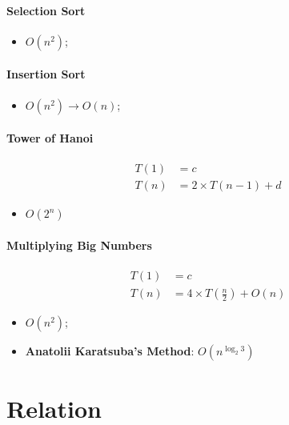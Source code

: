 \documentclass[letterpaper, 11pt]{article}
\begin{document}
      \paragraph{Selection Sort}
      \begin{itemize}
        \item $ O \left( n^{2} \right) $;
      \end{itemize}
      
      \paragraph{Insertion Sort}
      \begin{itemize}
        \item $ O \left( n^{2} \right) \to O \left( n \right) $;
      \end{itemize}
      
      \paragraph{Tower of Hanoi}
      \begin{align*}
        T \left( 1 \right) &= c \\ 
        T \left( n \right) &= 2 \times T \left( n - 1 \right) + d
      \end{align*}
      \begin{itemize}
        \item $ O \left( 2^{n} \right) $
      \end{itemize}
      
      \paragraph{Multiplying Big Numbers}
      \begin{align*}
        T \left( 1 \right) &= c \\ 
        T \left( n \right) &= 4 \times T \left( \frac{n}{2} \right) + O \left( n \right)
      \end{align*}
      \begin{itemize}
        \item $ O \left( n^{2} \right) $;
        \item \textbf{Anatolii Karatsuba's Method}: $ O \left( n^{ \log_{2} 3 } \right) $
      \end{itemize}
    
  \section{Relation}
  
\end{document}
